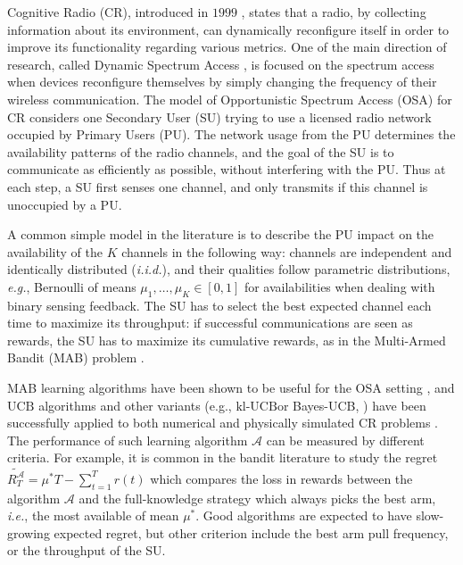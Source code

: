 \documentclass[conference]{IEEEtran}
\theoremstyle{plain}  %
\newcommand{\ie}{\emph{i.e.}}
\newcommand{\eg}{\emph{e.g.}}
\newcommand{\UCB}[0]{$\mathrm{UCB}$}
\newcommand{\klUCB}[0]{$\mathrm{kl}$-$\mathrm{UCB}$}
\newcommand{\Alg}[0]{\mathcal{A}}
\begin{document}
%
Cognitive Radio (CR), introduced in $1999$ \cite{Mitola99}, states that a radio,
by collecting information about its environment,
can dynamically reconfigure itself in order to improve its functionality regarding various metrics.
%
One of the main direction of research, called Dynamic Spectrum Access \cite{Haykin05}, is focused on the spectrum access when devices reconfigure themselves by simply changing the frequency of their wireless communication.
%
The model of Opportunistic Spectrum Access (OSA) for CR considers one Secondary User (SU) trying to use a licensed radio network %
occupied by Primary Users (PU).
The network usage from the PU determines the availability patterns of the radio channels, and the goal of the SU is to communicate as efficiently as possible, without interfering with the PU.
Thus at each step, a SU first senses one channel, and only transmits if this channel is unoccupied by a PU.

A common simple model in the literature is to describe
the PU impact on the availability of the $K$ channels
in the following way:
channels are independent and identically distributed (\emph{i.i.d.}),
and their qualities follow parametric distributions, \eg, Bernoulli of means $\mu_1,\dots,\mu_K \in [0,1]$ for availabilities when dealing with binary sensing feedback.
%
The SU has to select the best expected channel each time to maximize its throughput: if successful communications are seen as rewards, the SU has to maximize its cumulative rewards, as in the Multi-Armed Bandit (MAB) problem \cite{Robbins52,LaiRobbins85}.

%
MAB learning algorithms have been shown to be useful for the OSA setting \cite{Zhao07,Jouini10},
and \UCB{} algorithms and other variants (e.g., \klUCB or Bayes-UCB, \cite{Auer02,Garivier11KL,Kaufmann12BUCB,Bubeck12}) have been successfully applied to both numerical and physically simulated CR problems \cite{Jouini12}.
The performance of such learning algorithm $\Alg$ can be measured by different criteria. For example,  it is common in the bandit literature to study the regret \cite{Bubeck12}
$\widetilde{R_T^{\Alg}}=\mu^*T - \sum_{t=1}^{T} r(t)$ which compares the loss in rewards
between the algorithm $\Alg$ and the full-knowledge strategy which always picks the best arm, \ie, the most available of mean $\mu^*$.
Good algorithms are expected to have slow-growing expected regret,
but other criterion include the best arm pull frequency, or the throughput of the SU.
\end{document}
